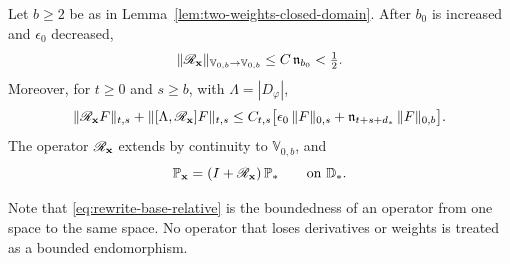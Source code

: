 \begin{lemma}
\label{lem:relative}
Let $b\ge2$ be as in Lemma~\ref{lem:two-weights-closed-domain}. After
$b_0$ is increased and $\epsilon_0$ decreased,
\begin{equation}\label{eq:rewrite-base-relative}
 \|\mathscr R_{\mathbf x}\|_{\mathbb V_{0,b}\to\mathbb V_{0,b}}
                         \le C\,\mathfrak n_{b_0}<\tfrac12 .
\end{equation}
Moreover, for $t\ge0$ and $s\ge b$, with $\Lambda=|D_\varphi|$,
\begin{equation}\label{eq:compact-volume-relative-bound}
 \|\mathscr R_{\mathbf x}F\|_{t,s}
 +\|[\Lambda,\mathscr R_{\mathbf x}]F\|_{t,s}
 \le C_{t,s}\bigl[\epsilon_0\,\|F\|_{0,s}
             +\mathfrak n_{t+s+d_*}\,\|F\|_{0,b}\bigr] .
\end{equation}
The operator $\mathscr R_{\mathbf x}$ extends by continuity to
$\mathbb V_{0,b}$, and
\begin{equation}\label{eq:current-fixed-domain-factorization}
 \mathbb P_{\mathbf x}=(I+\mathscr R_{\mathbf x})\,\mathbb P_*
                         \qquad\text{on }\mathbb D_* .
\end{equation}
\end{lemma}

Note that \eqref{eq:rewrite-base-relative} is the boundedness of an
operator from one space to the same space. No operator that loses
derivatives or weights is treated as a bounded endomorphism.

